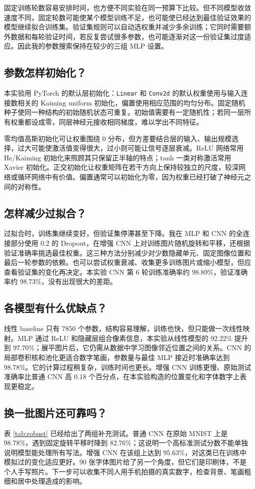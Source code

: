 \documentclass[11pt,a4paper]{ctexart}
\begin{document}
固定训练轮数容易安排时间，也方便不同实验在同一预算下比较。但不同模型收敛速度不同，固定轮数可能使某个模型训练不足，也可能使已经达到最佳验证效果的模型继续拟合训练集。验证集规则可以自动选权重并减少多余训练；它同时需要额外数据和每轮验证时间，若反复尝试很多参数，也可能逐渐对这一份验证集过度适应。因此我的参数搜索保持在较少的三组 MLP 设置。

\subsection{参数怎样初始化？}
本实验用 PyTorch 的默认层初始化：\texttt{Linear} 和 \texttt{Conv2d} 的默认权重使用与输入连接数相关的 Kaiming uniform 初始化，偏置使用相应范围的均匀分布。固定随机种子使同一种结构的初始随机状态可重复。初始值需要有一定随机性；若同一层所有权重都设成零，同层神经元接收相同梯度，难以学出不同特征。

零均值高斯初始化可让权重围绕 0 分布，但方差要结合层的输入、输出规模选择，过大可能使激活值变得很大，过小则可能让信号逐层衰减。ReLU 网络常用 He/Kaiming 初始化来照顾其只保留正半轴的特点；tanh 一类对称激活常用 Xavier 初始化。正交初始化让权重矩阵在若干方向上保持较独立的尺度，较深网络或循环网络中有价值。偏置通常可以初始化为零，因为权重已经打破了神经元之间的对称性。

\subsection{怎样减少过拟合？}
过拟合时，训练集继续变好，但验证集停滞甚至下降。我在 MLP 和 CNN 的全连接部分使用 0.2 的 Dropout，在增强 CNN 上对训练图片随机旋转和平移，还根据验证准确率挑选最佳权重。这三种方法分别减少对少数隐藏单元、固定图像位置和最后一轮参数的依赖。也可以尝试权重衰减、收集更多训练图片或缩小模型，但应查看验证集的变化再决定。本实验 CNN 第 6 轮训练准确率约 98.89\%，验证准确率约 98.73\%，没有出现很大的差距。

\subsection{各模型有什么优缺点？}
线性 baseline 只有 7850 个参数，结构容易理解，训练也快，但只能做一次线性映射。MLP 通过 ReLU 和隐藏层组合像素信息，本实验从线性模型的 92.22\% 提升到 97.70\%；展平图片后，它仍需从数据中学习图像邻近位置之间的关系。CNN 的局部卷积核和池化更适合数字笔画，参数量与最佳 MLP 接近时准确率达到 98.78\%。它的计算过程稍复杂，训练时间也更长。增强 CNN 训练更慢、原始测试准确率比普通 CNN 高 0.18 个百分点，在本实验构造的位置变化和字体数字上表现更稳定。

\subsection{换一批图片还可靠吗？}
表 \ref{tab:robust} 已经给出了两组补充测试。普通 CNN 在原始 MNIST 上是 98.78\%，遇到固定旋转平移时降到 82.76\%；这说明一个高标准测试分数不能单独说明模型能处理所有写法。增强 CNN 在该组上达到 95.63\%，对这类已在训练中模拟过的变化适应更好。90 张字体图片给了另一个角度，但它们是印刷体，不是个人手写照片。下一步可以收集不同人用手机拍摄的真实数字，检查背景、笔画粗细和居中处理造成的影响。
\end{document}
